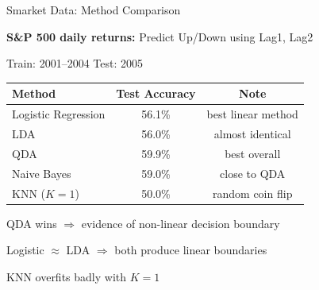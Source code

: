 \documentclass[aspectratio=169, 11pt]{beamer}
\begin{document}
\begin{frame}{Smarket Data: Method Comparison}

\textbf{S\&P 500 daily returns:} Predict Up/Down using Lag1, Lag2

Train: 2001--2004 \quad Test: 2005

\vspace{0.3em}
\begin{center}
\begin{tabular}{lcc}
\toprule
Method & Test Accuracy & Note \\
\midrule
Logistic Regression & 56.1\% & best linear method \\
LDA & 56.0\% & almost identical \\
QDA & 59.9\% & \textcolor{softgreen}{best overall} \\
Naive Bayes & 59.0\% & close to QDA \\
KNN ($K=1$) & 50.0\% & random coin flip \\
\bottomrule
\end{tabular}
\end{center}

\vspace{0.3em}
QDA wins $\Rightarrow$ evidence of non-linear decision boundary

Logistic $\approx$ LDA $\Rightarrow$ both produce linear boundaries

KNN overfits badly with $K=1$
\end{frame}
\end{document}
